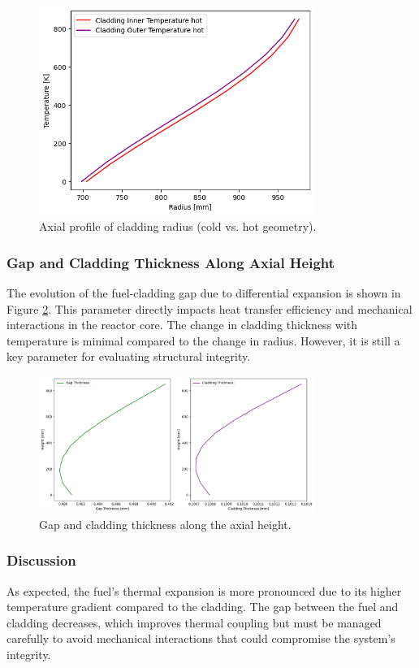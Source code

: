 \begin{figure}[H]
\centering
\includegraphics[width=0.8\textwidth]{3_clad_inout_diff.png}
\caption{Axial profile of cladding radius (cold vs. hot geometry).}
\label{fig:Cladding_Radius_ColdHot}
\end{figure}

\subsubsection{Gap and Cladding Thickness Along Axial Height}

The evolution of the fuel-cladding gap due to differential expansion is shown in Figure \ref{fig:Gap_Cladding_Thickness}. This parameter directly impacts heat transfer efficiency and mechanical interactions in the reactor core. The change in cladding thickness with temperature is minimal compared to the change in radius. However, it is still a key parameter for evaluating structural integrity.

\begin{figure}[H]
\centering
\includegraphics[width=0.8\textwidth]{4_gap_clad_thickness.png}
\caption{Gap and cladding thickness along the axial height.}
\label{fig:Gap_Cladding_Thickness}
\end{figure}

\subsubsection{Discussion}

As expected, the fuel's thermal expansion is more pronounced due to its higher temperature gradient compared to the cladding. The gap between the fuel and cladding decreases, which improves thermal coupling but must be managed carefully to avoid mechanical interactions that could compromise the system's integrity.
